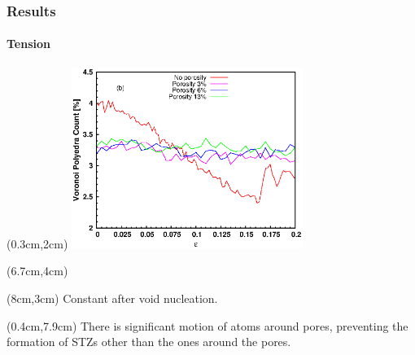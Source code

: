 \documentclass[12pt,t]{beamer}
\begin{document}
\begin{frame}
    \frametitle{Results}
    \framesubtitle{Tension}
    \begin{textblock*}{7.5cm}(0.3cm,2cm) %
        \includegraphics[width=7.5cm]{Presentacion_PANACM_Franco/tipe3_strain_tens.eps}
    \end{textblock*}
    \begin{textblock*}{4.2cm}(6.7cm,4cm) %
    \end{textblock*}
    \begin{textblock*}{5cm}(8cm,3cm) %
        Constant after void nucleation.
    \end{textblock*}
    \begin{textblock*}{12cm}(0.4cm,7.9cm) %
        There is significant motion of atoms around pores, preventing the formation of STZs other than the ones around the pores.
    \end{textblock*}
\end{frame}

\end{document}
